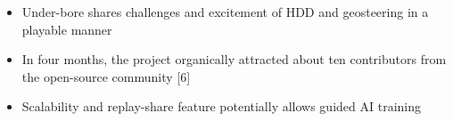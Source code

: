 
\begin{itemize}
\tightlist
	\item Under-bore shares challenges and excitement of HDD and geosteering in a playable manner
	\item In four months, the project organically attracted about ten contributors from the open-source community [6]
	\item Scalability and replay-share feature potentially allows guided AI training
\end{itemize}

